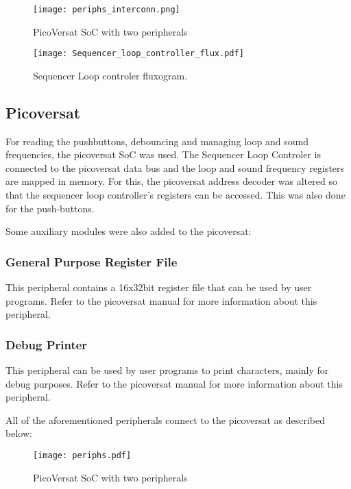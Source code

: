     \begin{figure}[!htbp]
      \centerline{\texttt{[image: periphs\_interconn.png]}}
      \vspace{0cm}\caption{PicoVersat SoC with two peripherals}
      \label{fig:periphs}
  \end{figure}

\begin{figure}[!htbp]
  \centerline{\texttt{[image: Sequencer\_loop\_controller\_flux.pdf]}}
  \vspace{0cm}\caption{Sequencer Loop controler fluxogram.}
  \label{fig:bd}
\end{figure}


\subsection{Picoversat}

For reading the pushbuttons, debouncing and managing loop and sound frequencies, the picoversat SoC was used. The Sequencer Loop Controler is connected to the picoversat data bus and the loop and sound frequency registers are mapped in memory. For this, the picoversat address decoder was altered so that the sequencer loop controller's registers can be accessed. This was also done for the push-buttons.

Some auxiliary modules were also added to the picoversat:

\subsubsection{General Purpose Register File}

This peripheral contains a 16x32bit register file that can be used by user
programs. Refer to the picoversat manual for more information about this peripheral. 


\subsubsection{Debug Printer}

This peripheral can be used by user programs to print characters, mainly for
debug purposes. Refer to the picoversat manual for more information about this peripheral.


All of the aforementioned peripherals connect to the picoversat as described below:

\begin{figure}[!htbp]
  \centerline{\texttt{[image: periphs.pdf]}}
  \vspace{0cm}\caption{PicoVersat SoC with two peripherals}
  \label{fig:periphs}
\end{figure}


